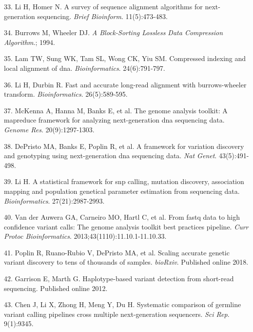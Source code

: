 \documentclass[11pt,letterpaper]{book}
\begin{document}
\leavevmode\hypertarget{ref-li:2010aa}{}%
33. Li H, Homer N. A survey of sequence alignment algorithms for next-generation sequencing. \emph{Brief Bioinform}. 11(5):473-483.

\leavevmode\hypertarget{ref-burrows:1994aa}{}%
34. Burrows M, Wheeler DJ. \emph{A Block-Sorting Lossless Data Compression Algorithm}.; 1994.

\leavevmode\hypertarget{ref-lam:2008aa}{}%
35. Lam TW, Sung WK, Tam SL, Wong CK, Yiu SM. Compressed indexing and local alignment of dna. \emph{Bioinformatics}. 24(6):791-797.

\leavevmode\hypertarget{ref-li:2010ab}{}%
36. Li H, Durbin R. Fast and accurate long-read alignment with burrows-wheeler transform. \emph{Bioinformatics}. 26(5):589-595.

\leavevmode\hypertarget{ref-mckenna:2010aa}{}%
37. McKenna A, Hanna M, Banks E, et al. The genome analysis toolkit: A mapreduce framework for analyzing next-generation dna sequencing data. \emph{Genome Res}. 20(9):1297-1303.

\leavevmode\hypertarget{ref-depristo:2011aa}{}%
38. DePristo MA, Banks E, Poplin R, et al. A framework for variation discovery and genotyping using next-generation dna sequencing data. \emph{Nat Genet}. 43(5):491-498.

\leavevmode\hypertarget{ref-li:2011aa}{}%
39. Li H. A statistical framework for snp calling, mutation discovery, association mapping and population genetical parameter estimation from sequencing data. \emph{Bioinformatics}. 27(21):2987-2993.

\leavevmode\hypertarget{ref-van-der-auwera:2013aa}{}%
40. Van der Auwera GA, Carneiro MO, Hartl C, et al. From fastq data to high confidence variant calls: The genome analysis toolkit best practices pipeline. \emph{Curr Protoc Bioinformatics}. 2013;43(1110):11.10.1-11.10.33.

\leavevmode\hypertarget{ref-poplin:2018aa}{}%
41. Poplin R, Ruano-Rubio V, DePristo MA, et al. Scaling accurate genetic variant discovery to tens of thousands of samples. \emph{bioRxiv}. Published online 2018.

\leavevmode\hypertarget{ref-garrison:2012aa}{}%
42. Garrison E, Marth G. Haplotype-based variant detection from short-read sequencing. Published online 2012.

\leavevmode\hypertarget{ref-chen:2019aa}{}%
43. Chen J, Li X, Zhong H, Meng Y, Du H. Systematic comparison of germline variant calling pipelines cross multiple next-generation sequencers. \emph{Sci Rep}. 9(1):9345.
\end{document}
